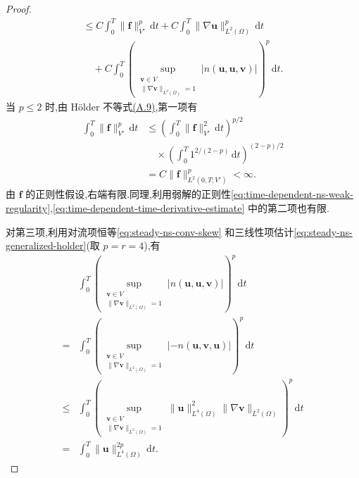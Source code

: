 \begin{lemma}[时间导数的正则性]
\begin{proof}
\begin{equation}
\begin{gathered}
  \le C\int_0^T\|\bm{f}\|_{V'}^p\,\mathrm{d}t
       +C\int_0^T\|\nabla\bm{u}\|_{L^2(\Omega)}^p\,\mathrm{d}t\\
  \quad+C\int_0^T\left(
        \sup_{\substack{\bm{v}\in V\\
                        \|\nabla\bm{v}\|_{L^2(\Omega)}=1}}
        |n(\bm{u},\bm{u},\bm{v})|
      \right)^p\,\mathrm{d}t.
\end{gathered}
\end{equation}
当 $p\le2$ 时,由 Hölder 不等式\hyperref[eq:appendix-a-9]{(A.9)},第一项有
\[
\begin{aligned}
  \int_0^T\|\bm{f}\|_{V'}^p\,\mathrm{d}t
  &\le\left(\int_0^T\|\bm{f}\|_{V'}^2\,\mathrm{d}t\right)^{p/2}\\
  &\quad\times\left(\int_0^T1^{2/(2-p)}\,\mathrm{d}t\right)^{(2-p)/2}\\
  &=C\|\bm{f}\|_{L^2(0,T;V')}^p<\infty.
\end{aligned}
\]
由 $\bm{f}$ 的正则性假设,右端有限.同理,利用弱解的正则性\cref{eq:time-dependent-ns-weak-regularity},\cref{eq:time-dependent-time-derivative-estimate} 中的第二项也有限.

对第三项,利用对流项恒等\cref{eq:steady-ns-conv-skew} 和三线性项估计\cref{eq:steady-ns-generalized-holder}(取 $p=r=4$),有
\begin{equation}\label{eq:time-dependent-time-derivative-convection-bound}
\begin{aligned}
  &\int_0^T\left(
      \sup_{\substack{\bm{v}\in V\\
                      \|\nabla\bm{v}\|_{L^2(\Omega)}=1}}
      |n(\bm{u},\bm{u},\bm{v})|
    \right)^p\,\mathrm{d}t\\
  ={}&\int_0^T\left(
      \sup_{\substack{\bm{v}\in V\\
                      \|\nabla\bm{v}\|_{L^2(\Omega)}=1}}
      |-n(\bm{u},\bm{v},\bm{u})|
    \right)^p\,\mathrm{d}t\\
  \le{}&\int_0^T\left(
      \sup_{\substack{\bm{v}\in V\\
                      \|\nabla\bm{v}\|_{L^2(\Omega)}=1}}
      \|\bm{u}\|_{L^4(\Omega)}^2
      \|\nabla\bm{v}\|_{L^2(\Omega)}
    \right)^p\,\mathrm{d}t\\
  ={}&\int_0^T\|\bm{u}\|_{L^4(\Omega)}^{2p}\,\mathrm{d}t.
\end{aligned}
\end{equation}


\end{proof}
\end{lemma}
